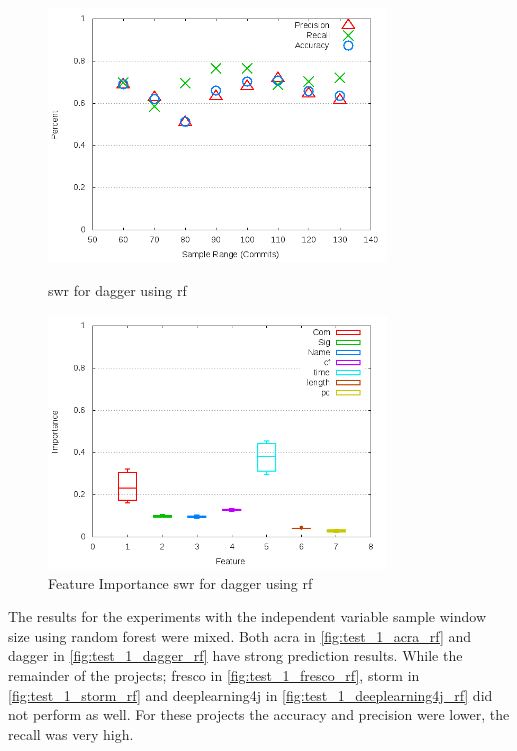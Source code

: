 \begin{figure}[!ht]
    \centering
        \includegraphics[width=0.8\textwidth]{images/rf/test_1/dagger_sample_range}
        \caption{\gls{swr} for dagger using \gls{rf}}
        \label{fig:test_1_dagger_rf}

    \includegraphics[width=0.8\textwidth]{images/rf/test_1/dagger_importance}
        \caption{Feature Importance \gls{swr} for dagger using \gls{rf}}
        \label{fig:test_1_dagger_rf_importance}
\end{figure}



The results for the experiments with the independent variable sample window size using random forest were mixed. Both acra in \autoref{fig:test_1_acra_rf} and dagger in \autoref{fig:test_1_dagger_rf} have strong prediction results. While the remainder of the projects; fresco in \autoref{fig:test_1_fresco_rf}, storm in \autoref{fig:test_1_storm_rf} and deeplearning4j in \autoref{fig:test_1_deeplearning4j_rf} did not perform as well. For these projects the accuracy and precision were lower, the recall was very high.

